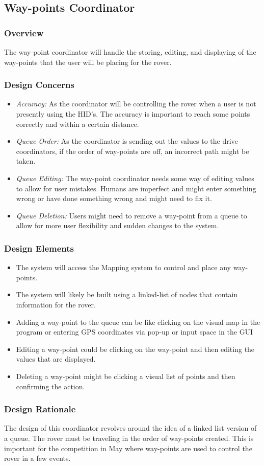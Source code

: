 \subsection{Way-points Coordinator}
\subsubsection{Overview}
The way-point coordinator will handle the storing, editing, and displaying of the way-points that the user will be placing for the rover.

\subsubsection{Design Concerns}
\begin{itemize}
\item \textit{Accuracy:} As the coordinator will be controlling the rover when a user is not presently using the HID's. The accuracy is important to reach some points correctly and within a certain distance.
\item \textit{Queue Order:} As the coordinator is sending out the values to the drive coordinators, if the order of way-points are off, an incorrect path might be taken.
\item \textit{Queue Editing:} The way-point coordinator needs some way of editing values to allow for user mistakes. Humans are imperfect and might enter something wrong or have done something wrong and might need to fix it.
\item \textit{Queue Deletion:} Users might need to remove a way-point from a queue to allow for more user flexibility and sudden changes to the system.
\end{itemize}

\subsubsection{Design Elements}
\begin{itemize}
\item The system will access the Mapping system to control and place any way-points.
\item The system will likely be built using a linked-list of nodes that contain information for the rover.
\item Adding a way-point to the queue can be like clicking on the visual map in the program or entering GPS coordinates via pop-up or input space in the GUI
\item Editing a way-point could be clicking on the way-point and then editing the values that are displayed.
\item Deleting a way-point might be clicking a visual list of points and then confirming the action.
\end{itemize}

\subsubsection{Design Rationale}
The design of this coordinator revolves around the idea of a linked list version of a queue.
The rover must be traveling in the order of way-points created.
This is important for the competition in May where way-points are used to control the rover in a few events.